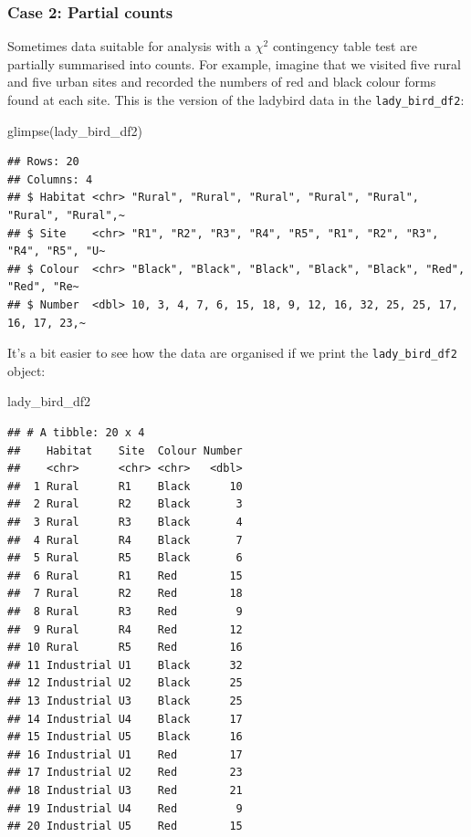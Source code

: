 \documentclass[
]{book}
\newenvironment{Shaded}{\begin{snugshade}}{\end{snugshade}}
\newcommand{\FunctionTok}[1]{\textcolor[rgb]{0.00,0.00,0.00}{#1}}
\newcommand{\NormalTok}[1]{#1}
\begin{document}
\hypertarget{case-2-partial-counts}{%
\subsubsection{\texorpdfstring{\textbf{Case 2: Partial counts}}{Case 2: Partial counts}}\label{case-2-partial-counts}}

Sometimes data suitable for analysis with a \(\chi^{2}\) contingency table test are partially summarised into counts. For example, imagine that we visited five rural and five urban sites and recorded the numbers of red and black colour forms found at each site. This is the version of the ladybird data in the \texttt{lady\_bird\_df2}:

\begin{Shaded}
\begin{Highlighting}[]
\FunctionTok{glimpse}\NormalTok{(lady\_bird\_df2)}
\end{Highlighting}
\end{Shaded}

\begin{verbatim}
## Rows: 20
## Columns: 4
## $ Habitat <chr> "Rural", "Rural", "Rural", "Rural", "Rural", "Rural", "Rural",~
## $ Site    <chr> "R1", "R2", "R3", "R4", "R5", "R1", "R2", "R3", "R4", "R5", "U~
## $ Colour  <chr> "Black", "Black", "Black", "Black", "Black", "Red", "Red", "Re~
## $ Number  <dbl> 10, 3, 4, 7, 6, 15, 18, 9, 12, 16, 32, 25, 25, 17, 16, 17, 23,~
\end{verbatim}

It's a bit easier to see how the data are organised if we print the \texttt{lady\_bird\_df2} object:

\begin{Shaded}
\begin{Highlighting}[]
\NormalTok{lady\_bird\_df2}
\end{Highlighting}
\end{Shaded}

\begin{verbatim}
## # A tibble: 20 x 4
##    Habitat    Site  Colour Number
##    <chr>      <chr> <chr>   <dbl>
##  1 Rural      R1    Black      10
##  2 Rural      R2    Black       3
##  3 Rural      R3    Black       4
##  4 Rural      R4    Black       7
##  5 Rural      R5    Black       6
##  6 Rural      R1    Red        15
##  7 Rural      R2    Red        18
##  8 Rural      R3    Red         9
##  9 Rural      R4    Red        12
## 10 Rural      R5    Red        16
## 11 Industrial U1    Black      32
## 12 Industrial U2    Black      25
## 13 Industrial U3    Black      25
## 14 Industrial U4    Black      17
## 15 Industrial U5    Black      16
## 16 Industrial U1    Red        17
## 17 Industrial U2    Red        23
## 18 Industrial U3    Red        21
## 19 Industrial U4    Red         9
## 20 Industrial U5    Red        15
\end{verbatim}
\end{document}
